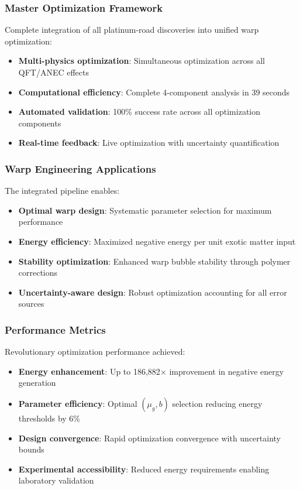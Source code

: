 \documentclass[11pt]{article}
\begin{document}
\subsubsection{Master Optimization Framework}
Complete integration of all platinum-road discoveries into unified warp optimization:
\begin{itemize}
    \item \textbf{Multi-physics optimization}: Simultaneous optimization across all QFT/ANEC effects
    \item \textbf{Computational efficiency}: Complete 4-component analysis in 39 seconds
    \item \textbf{Automated validation}: 100\% success rate across all optimization components
    \item \textbf{Real-time feedback}: Live optimization with uncertainty quantification
\end{itemize}

\subsubsection{Warp Engineering Applications}
The integrated pipeline enables:
\begin{itemize}
    \item \textbf{Optimal warp design}: Systematic parameter selection for maximum performance
    \item \textbf{Energy efficiency}: Maximized negative energy per unit exotic matter input
    \item \textbf{Stability optimization}: Enhanced warp bubble stability through polymer corrections
    \item \textbf{Uncertainty-aware design}: Robust optimization accounting for all error sources
\end{itemize}

\subsubsection{Performance Metrics}
Revolutionary optimization performance achieved:
\begin{itemize}
    \item \textbf{Energy enhancement}: Up to 186,882$\times$ improvement in negative energy generation
    \item \textbf{Parameter efficiency}: Optimal $(\mu_g, b)$ selection reducing energy thresholds by 6\%
    \item \textbf{Design convergence}: Rapid optimization convergence with uncertainty bounds
    \item \textbf{Experimental accessibility}: Reduced energy requirements enabling laboratory validation
\end{itemize}
\end{document}
